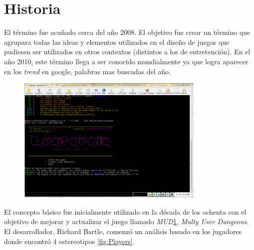 \section{Historia}

El término {\GAM} fue acuñado cerca del año 2008\cite{DefineGamefication}.
El objetivo fue crear un término que agrupara todas las ideas y elementos
utilizados en el diseño de juegos que pudiesen ser utilizados en otros contextos
(distintos a los de entretención).
En el año 2010, este término llega a ser conocido mundialmente ya que logra
aparecer en los \emph{trend} en google\cite{LiCap1.3}, palabras mas buscadas
del año.

\begin{figure}[!htb]
  \centering
  \includegraphics[width=0.8\textwidth]{images/mudclient.png}
  \caption[Caption for LOF]{}
  \label{fig:MudClient}
\end{figure}

El concepto básico fue inicialmente utilizado en la década de los ochenta con el
objetivo de mejorar y actualizar el juego llamado \emph{MUD}\ref{fig:MudClient},
\emph{Multy User Dungeons}.
El desarrollador, Richard Bartle, comenzó un análisis basado en los jugadores
donde encontró 4 estereotipos \ref{fig:Players}.

